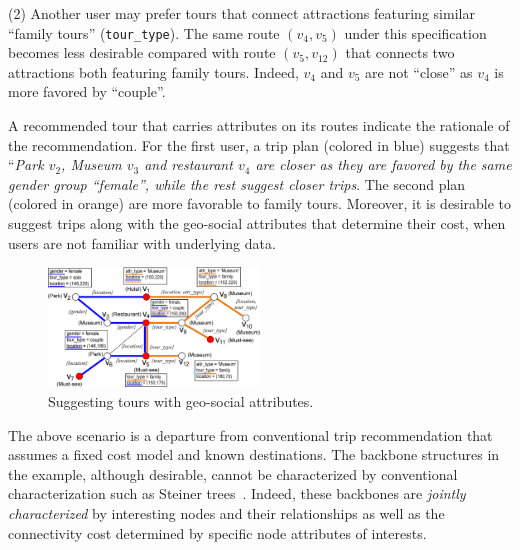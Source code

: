 \begin{example}
\sstab
(2) Another user may prefer tours that
connect attractions
featuring similar ``family tours'' (\texttt{tour\_type}).
The same route $(v_4, v_5)$
under this specification %
becomes less desirable compared with
route $(v_5, v_{12})$ that connects two
attractions both featuring family tours.
Indeed, $v_4$ and $v_5$ are not
``close'' as $v_4$ is
more favored by ``couple''.

\vspace{.5ex}
A recommended tour that carries
attributes on its routes 
indicate the rationale of the
recommendation. For the first user,
a trip plan (colored in blue)
suggests that ``{\em Park $v_2$, Museum $v_3$ and
restaurant $v_4$ are closer as
they are favored by the same gender group
``female'', while the rest suggest
closer trips}. The second plan (colored in orange)
are more favorable to family tours.
Moreover, it is desirable to suggest trips along with the geo-social attributes
that determine their cost,
when users are not familiar with
underlying data.
\end{example}

\begin{figure}[tb!]
\centering
\centerline{\includegraphics[width=0.5\textwidth]{./fig/Fig1-backbone-example.eps}}
\caption{Suggesting tours %
 with geo-social attributes.
}
\label{fig:backboneex}
\vspace{-2ex}
\end{figure}


The above scenario is a departure from conventional 
trip recommendation that assumes 
a fixed cost model and known destinations. 
The backbone structures in the example, although
desirable, cannot be characterized by 
conventional characterization such as
Steiner trees~\cite{chiang2013steiner}. 
Indeed, these backbones are
{\em jointly characterized} by
interesting nodes and
their relationships as well as
the connectivity cost determined by
specific node attributes of interests. 

